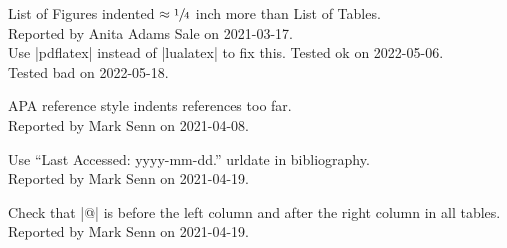 List of Figures indented \(\approx\sfrac14\) inch
more than List of Tables.\\
Reported by Anita Adams Sale on 2021-03-17.\\
Use |pdflatex| instead of |lualatex| to fix this.
Tested ok on 2022-05-06.\\
Tested bad on 2022-05-18.

APA reference style indents references too far.\\
Reported by Mark Senn on 2021-04-08.

Use ``Last Accessed: yyyy-mm-dd.'' urldate in bibliography.\\
Reported by Mark Senn on 2021-04-19.

Check that |@{}| is before the left column
and after the right column in all tables.\\
Reported by Mark Senn on 2021-04-19.

